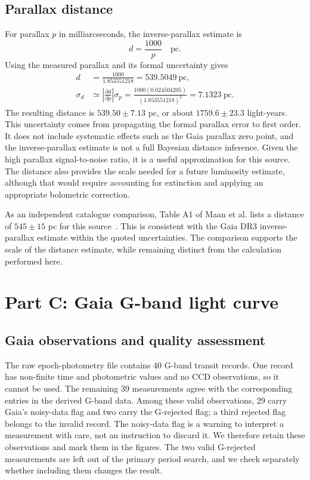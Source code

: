 \documentclass[12pt,a4paper]{article}
\begin{document}
\subsection{Parallax distance}
For parallax $p$ in milliarcseconds, the inverse-parallax estimate is
\begin{equation}
d=\frac{1000}{p}\quad\mathrm{pc}.
\end{equation}
Using the measured parallax and its formal uncertainty gives
\begin{align*}
d &= \frac{1000}{1.853551218}=539.5049\ \mathrm{pc},\\
\sigma_d &\simeq \left|\frac{\partial d}{\partial p}\right|\sigma_p
=\frac{1000(0.024504205)}{(1.853551218)^2}=7.1323\ \mathrm{pc}.
\end{align*}
The resulting distance is $539.50\pm7.13$ pc, or about $1759.6\pm23.3$ light-years. This uncertainty comes from propagating the formal parallax error to first order. It does not include systematic effects such as the Gaia parallax zero point, and the inverse-parallax estimate is not a full Bayesian distance inference. Given the high parallax signal-to-noise ratio, it is a useful approximation for this source. The distance also provides the scale needed for a future luminosity estimate, although that would require accounting for extinction and applying an appropriate bolometric correction.

As an independent catalogue comparison, Table A1 of Maan et al. lists a distance of $545\pm15$ pc for this source~\cite{maan2025}. This is consistent with the Gaia DR3 inverse-parallax estimate within the quoted uncertainties. The comparison supports the scale of the distance estimate, while remaining distinct from the calculation performed here.
\FloatBarrier

\section{Part C: Gaia G-band light curve}
\subsection{Gaia observations and quality assessment}
The raw epoch-photometry file contains 40 G-band transit records. One record has non-finite time and photometric values and no CCD observations, so it cannot be used. The remaining 39 measurements agree with the corresponding entries in the derived G-band data. Among these valid observations, 29 carry Gaia's noisy-data flag and two carry the G-rejected flag; a third rejected flag belongs to the invalid record. The noisy-data flag is a warning to interpret a measurement with care, not an instruction to discard it. We therefore retain these observations and mark them in the figures. The two valid G-rejected measurements are left out of the primary period search, and we check separately whether including them changes the result.
\end{document}

